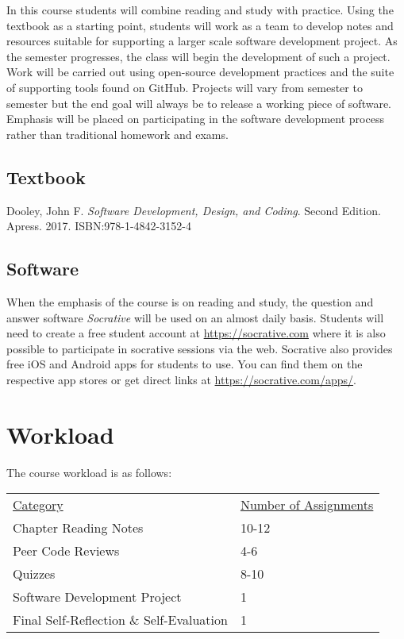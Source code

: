 \documentclass[10pt]{article}
\begin{document}
In this course students will combine reading and study with practice. Using the textbook as a starting point, students will work as a team to develop notes and resources suitable for supporting a larger scale software development project. As the semester progresses, the class will begin the development of such a project. Work will be carried out using open-source development practices and the suite of supporting tools found on GitHub. Projects will vary from semester to semester but the end goal will always be to release a working piece of software. Emphasis will be placed on participating in the software development process rather than traditional homework and exams.

\subsection{Textbook}

\noindent
Dooley, John F. \textit{Software Development, Design, and Coding}. Second Edition. Apress. 2017. ISBN:978-1-4842-3152-4 %


\subsection{Software}

When the emphasis of the course is on reading and study, the question and answer software \textit{Socrative} will be used on an almost daily basis. Students will need to create a free student account at \url{https://socrative.com} where it is also possible to participate in socrative sessions via the web.  Socrative also provides free iOS and Android apps for students to use. You can find them on the respective app stores or get direct links at \url{https://socrative.com/apps/}.


\section{Workload}

The course workload is as follows:
\begin{center}
  \begin{tabular}{ll}
    \underline{Category} & \underline{Number of Assignments} \\
    Chapter Reading Notes & 10-12\\
    Peer Code Reviews & 4-6\\
    Quizzes & 8-10\\
    Software Development Project & 1\\
    Final Self-Reflection \& Self-Evaluation & 1\\
  \end{tabular}
\end{center}
\end{document}

